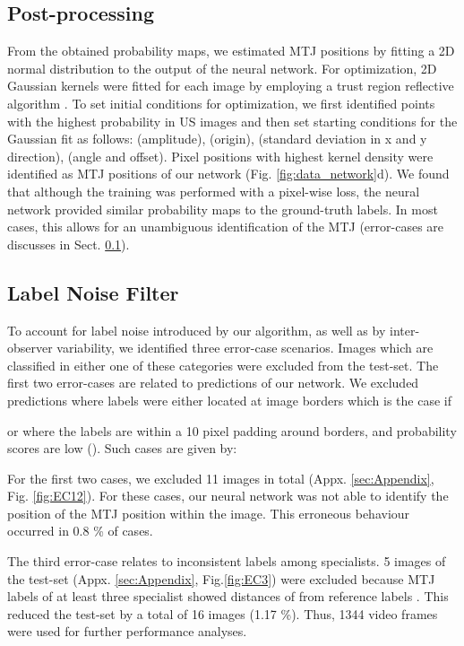\documentclass[journal,twoside,web]{ieeecolor}
\begin{document}
\subsection*{Post-processing}
\label{sec:methods.post}

From the obtained probability maps, we estimated MTJ positions by fitting a 2D normal distribution to the output of the neural network. For optimization, 2D Gaussian kernels were fitted for each image by employing a trust region reflective algorithm \cite{j:Branch1999}. To set initial conditions for optimization, we first identified points with the highest probability in US images  and then set starting conditions for the Gaussian fit as follows:  (amplitude),  (origin),  (standard deviation in x and y direction),  (angle and offset). Pixel positions with highest kernel density were identified as MTJ positions  of our network (Fig. \ref{fig:data_network}d). We found that although the training was performed with a pixel-wise loss, the neural network provided similar probability maps to the ground-truth labels. In most cases, this allows for an unambiguous identification of the MTJ (error-cases are discusses in Sect. \ref{sec:errorcases}). 


\subsection{Label Noise Filter}
\label{sec:errorcases}
To account for label noise introduced by our algorithm, as well as by inter-observer variability, we identified three error-case scenarios. Images which are classified in either one of these categories were excluded from the test-set. The first two error-cases are related to predictions of our network. We excluded predictions where labels were either located at image borders which is the case if 


or where the labels are within a 10 pixel padding around borders, and probability scores are low (). Such cases are given by:


\vspace{0.8cm}

For the first two cases, we excluded 11 images in total (Appx. \ref{sec:Appendix}, Fig. \ref{fig:EC12}). For these cases, our neural network was not able to identify the position of the MTJ position within the image. This erroneous behaviour occurred in 0.8 \% of cases.

The third error-case relates to inconsistent labels among specialists. 5 images of the test-set (Appx. \ref{sec:Appendix}, Fig.\ref{fig:EC3}) were excluded because MTJ labels of at least three specialist showed distances of  from reference labels . This reduced the test-set by a total of 16 images (1.17 \%). Thus, 1344 video frames were used for further performance analyses.
\end{document}
